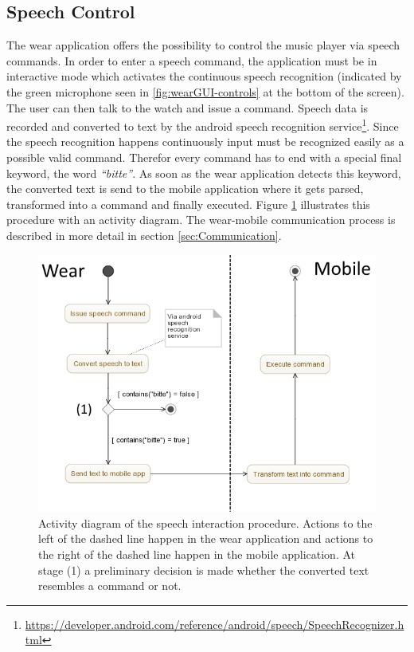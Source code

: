 \subsection{Speech Control}\label{sub:speechControl}
The wear application offers the possibility to control the music player via speech commands. In order to enter a speech command, the application must be in interactive mode which activates the continuous speech recognition (indicated by the green microphone seen in \ref{fig:wearGUI-controls} at the bottom of the screen). The user can then talk to the watch and issue a command. Speech data is recorded and converted to text by the android speech recognition service\footnote{\url{https://developer.android.com/reference/android/speech/SpeechRecognizer.html}}. Since the speech recognition happens continuously input must be recognized easily as a possible valid command. Therefor every command has to end with a special final keyword, the word \textit{``bitte''}. As soon as the wear application detects this keyword, the converted text is send to the mobile application where it gets parsed, transformed into a command and finally executed. Figure \ref{fig:speechActivityDiagram} illustrates this procedure with an activity diagram. The wear-mobile communication process is described in more detail in section \ref{sec:Communication}.
\begin{figure}[bth]
	\myfloatalign
	\includegraphics[width=1\linewidth]{img/SpeechActivityDiagram.png}
	\caption{Activity diagram of the speech interaction procedure. Actions to the left of the dashed line happen in the wear application and actions to the right of the dashed line happen in the mobile application. At stage (1) a preliminary decision is made whether the converted text resembles a command or not.}
	\label{fig:speechActivityDiagram}
\end{figure}

